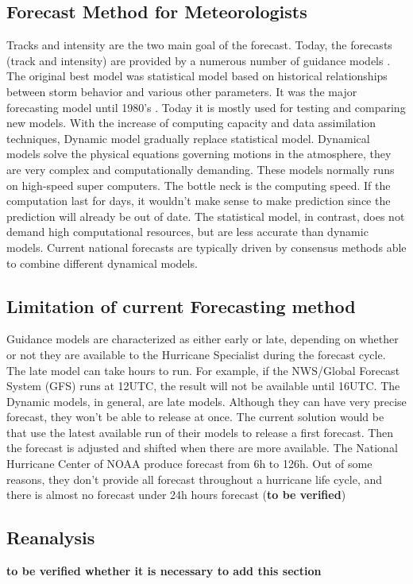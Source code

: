 \subsection{Forecast Method for Meteorologists}
Tracks and intensity are the two main goal of the forecast. Today, the forecasts (track and intensity) are provided by a numerous number of guidance models \cite{nhc_models}. The original best model was statistical model based on historical relationships between storm behavior and various other parameters. It was the major forecasting model until 1980's \cite{demaria2005further}. Today it is mostly used for testing and comparing new models. With the increase of computing capacity and data assimilation techniques, Dynamic model gradually replace statistical model. Dynamical models solve the physical equations governing motions in the atmosphere, they are very complex and computationally demanding. These models normally runs on high-speed super computers. The bottle neck is the computing speed. If the computation last for days, it wouldn't make sense to make prediction since the prediction will already be out of date. The statistical model, in contrast, does not demand high computational resources, but are less accurate than dynamic models. Current national forecasts are typically driven by consensus methods able to combine different dynamical models.

\subsection{Limitation of current Forecasting method}
Guidance models are characterized as either early or late, depending on whether or not they are available to the Hurricane Specialist during the forecast cycle. \cite{nhc_models} The late model can take hours to run. For example, if the NWS/Global Forecast System (GFS) runs at 12UTC, the result will not be available until 16UTC. The Dynamic models, in general, are late models. Although they can have very precise forecast, they won't be able to release at once. The current solution would be that use the latest available run of their models to release a first forecast. Then the forecast is adjusted and shifted when there are more available. The National Hurricane Center of NOAA produce forecast from 6h to 126h. Out of some reasons, they don't provide all forecast throughout a hurricane life cycle, and there is almost no forecast under 24h hours forecast (\textbf{to be verified})

\subsection{Reanalysis}
\textbf{to be verified whether it is necessary to add this section }



